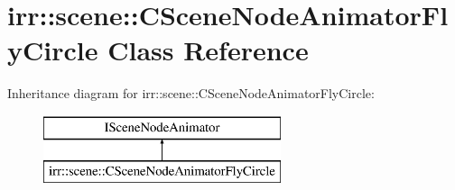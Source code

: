 \hypertarget{classirr_1_1scene_1_1_c_scene_node_animator_fly_circle}{\section{irr\-:\-:scene\-:\-:C\-Scene\-Node\-Animator\-Fly\-Circle Class Reference}
\label{classirr_1_1scene_1_1_c_scene_node_animator_fly_circle}
}
Inheritance diagram for irr\-:\-:scene\-:\-:C\-Scene\-Node\-Animator\-Fly\-Circle\-:\begin{figure}[H]
\begin{center}
\leavevmode
\includegraphics[height=2.000000cm]{classirr_1_1scene_1_1_c_scene_node_animator_fly_circle}
\end{center}
\end{figure}
